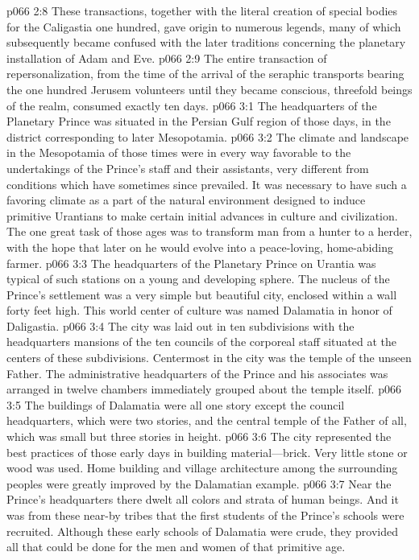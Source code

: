 \pc \vs p066 2:8 These transactions, together with the literal creation of special bodies for the Caligastia one hundred, gave origin to numerous legends, many of which subsequently became confused with the later traditions concerning the planetary installation of Adam and Eve.
\vs p066 2:9 The entire transaction of repersonalization, from the time of the arrival of the seraphic transports bearing the one hundred Jerusem volunteers until they became conscious, threefold beings of the realm, consumed exactly ten days.
\vs p066 3:1 The headquarters of the Planetary Prince was situated in the Persian Gulf region of those days, in the district corresponding to later Mesopotamia.
\vs p066 3:2 The climate and landscape in the Mesopotamia of those times were in every way favorable to the undertakings of the Prince’s staff and their assistants, very different from conditions which have sometimes since prevailed. It was necessary to have such a favoring climate as a part of the natural environment designed to induce primitive Urantians to make certain initial advances in culture and civilization. The one great task of those ages was to transform man from a hunter to a herder, with the hope that later on he would evolve into a peace\hyp{}loving, home\hyp{}abiding farmer.
\pc \vs p066 3:3 The headquarters of the Planetary Prince on Urantia was typical of such stations on a young and developing sphere. The nucleus of the Prince’s settlement was a very simple but beautiful city, enclosed within a wall forty feet high. This world center of culture was named Dalamatia in honor of Daligastia.
\vs p066 3:4 The city was laid out in ten subdivisions with the headquarters mansions of the ten councils of the corporeal staff situated at the centers of these subdivisions. Centermost in the city was the temple of the unseen Father. The administrative headquarters of the Prince and his associates was arranged in twelve chambers immediately grouped about the temple itself.
\vs p066 3:5 The buildings of Dalamatia were all one story except the council headquarters, which were two stories, and the central temple of the Father of all, which was small but three stories in height.
\vs p066 3:6 The city represented the best practices of those early days in building material---brick. Very little stone or wood was used. Home building and village architecture among the surrounding peoples were greatly improved by the Dalamatian example.
\pc \vs p066 3:7 Near the Prince’s headquarters there dwelt all colors and strata of human beings. And it was from these near\hyp{}by tribes that the first students of the Prince’s schools were recruited. Although these early schools of Dalamatia were crude, they provided all that could be done for the men and women of that primitive age.\plusone
